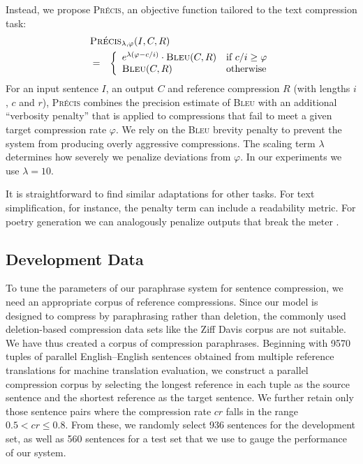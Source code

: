 \documentclass[11pt]{article}
\begin{document}

Instead, we propose \textsc{Pr\'ecis}, an objective function tailored
to the text compression task: \vspace{-0.2cm}
\begin{eqnarray}
  \lefteqn{ \textsc{Pr\'ecis}_{\lambda,\varphi} (I, C, R) } \nonumber \\
  &=& \left\{ \begin{array}{ll}
      e^{\lambda (\varphi - c/i)} \cdot \textsc{Bleu}(C, R) & \textrm{if
        $c/i \geq \varphi$} \nonumber \\ 
      \textsc{Bleu}(C, R) & \textrm{otherwise}
\end{array} \right.
\end{eqnarray}
For an input sentence $I$, an output $C$ and reference compression $R$
(with lengths $i$, $c$ and $r$), \textsc{Pr\'ecis} combines the
precision estimate of \textsc{Bleu} with an additional ``verbosity penalty'' that is
applied to compressions that fail to meet a given target compression
rate $\varphi$.  We rely on the \textsc{Bleu} brevity penalty to
prevent the system from producing overly aggressive compressions. The
scaling term $\lambda$ determines how severely we penalize deviations
from $\varphi$. In our experiments we use $\lambda = 10$.

It is straightforward to find similar adaptations for other tasks. For
text simplification, for instance, the penalty term can include a
readability metric. For poetry generation we can analogously penalize
outputs that break the meter \cite{Greene2010}.

\vspace{-.2cm}
\subsection{Development Data}
\label{dev-data}
To tune the parameters of our paraphrase system for sentence
compression, we need an appropriate corpus of reference
compressions. Since our model is designed to compress by paraphrasing
rather than deletion, the commonly used deletion-based compression
data sets like the Ziff Davis corpus are not suitable. We have thus
created a corpus of compression paraphrases. Beginning with 9570
tuples of parallel English--English sentences obtained from multiple
reference translations for machine translation evaluation, we
construct a parallel compression corpus by selecting the longest
reference in each tuple as the source sentence and the shortest
reference as the target sentence. We further retain only those
sentence pairs where the compression rate $\mathit{cr}$ falls in the
range $0.5 < \mathit{cr} \leq 0.8$. From these, we randomly select 936
sentences for the development set, as well as 560 sentences for a test
set that we use to gauge the performance of our system.
\end{document}

